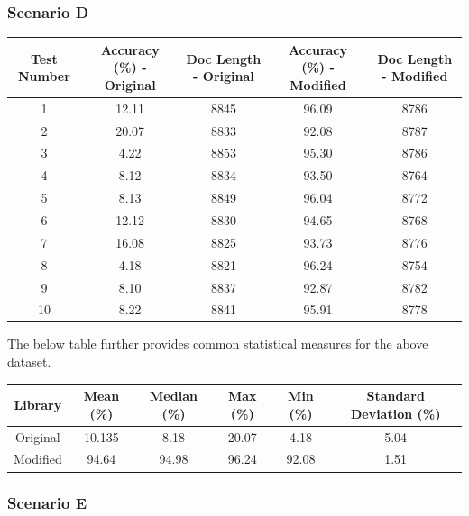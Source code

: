 \documentclass[9pt, titlepage]{article}
\begin{document}
  \subsubsection{Scenario D}
  
  \begin{center}
    \begin{tabular}{||c c c c c||} 
      \hline
      Test Number & Accuracy (\%) - Original & Doc Length - Original & Accuracy (\%) - Modified & Doc Length - Modified \\ [0.5ex] 
      \hline\hline
      1 & 12.11 & 8845 & 96.09 & 8786 \\ 
      \hline
      2 & 20.07 & 8833 & 92.08 & 8787 \\ 
      \hline
      3 &  4.22 & 8853 & 95.30 & 8786 \\ 
      \hline
      4 &  8.12 & 8834 & 93.50 & 8764 \\ 
      \hline
      5 &  8.13 & 8849 & 96.04 & 8772 \\ 
      \hline
      6 & 12.12 & 8830 & 94.65 & 8768 \\ 
      \hline
      7 & 16.08 & 8825 & 93.73 & 8776 \\ 
      \hline
      8 &  4.18 & 8821 & 96.24 & 8754 \\ 
      \hline
      9 &  8.10 & 8837 & 92.87 & 8782 \\ 
      \hline
      10 & 8.22 & 8841 & 95.91 & 8778 \\ 
      \hline
    \end{tabular}
  \end{center}
  
  The below table further provides common statistical measures for the above dataset.\\

  \begin{center}
    \begin{tabular}{||c c c c c c||} 
      \hline
      Library & Mean (\%) & Median (\%) & Max (\%) & Min (\%) & Standard Deviation (\%) \\ [0.5ex] 
      \hline\hline
      Original & 10.135 & 8.18 & 20.07 & 4.18 & 5.04 \\ 
      \hline
      Modified & 94.64 & 94.98 & 96.24 & 92.08 & 1.51 \\
      \hline
    \end{tabular}
  \end{center}
  \hfill

  \subsubsection{Scenario E}
  
\end{document}

